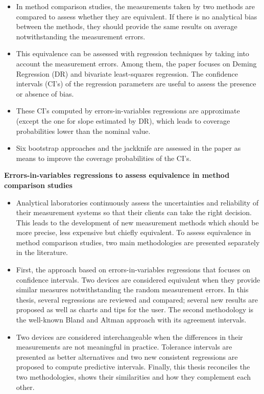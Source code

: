 \begin{itemize}
	\item In method comparison studies, the measurements taken by two methods are compared to assess whether they are equivalent. If there is no analytical bias between the methods, they should provide the same results on average notwithstanding the measurement errors.
	\item This equivalence can be assessed with regression techniques by taking into account the measurement errors. Among them, the paper focuses on Deming Regression (DR) and bivariate least-squares regression. The confidence intervals (CI's) of the regression parameters are useful to assess the presence or absence of bias. 
	\item These CI's computed by errors-in-variables regressions are approximate (except the one for slope estimated by DR), which leads to coverage probabilities lower than the nominal value. 
	\item Six bootstrap approaches and the jackknife are assessed in the paper as means to improve the coverage probabilities of the CI's.
\end{itemize}


\newpage
\textbf{Errors-in-variables regressions to assess equivalence in method comparison studies}
\begin{itemize}
\item Analytical laboratories continuously assess the uncertainties and reliability of their measurement systems so that their clients can take the right decision. This leads to the development of new measurement methods which should be more precise, less expensive but chiefly equivalent. To assess equivalence in method comparison studies, two main methodologies are presented separately in the literature. 
\item First, the approach based on errors-in-variables regressions that focuses on confidence intervals. Two devices are considered equivalent when they provide similar measures notwithstanding the random measurement errors. In this thesis, several regressions are reviewed and compared; several new results are proposed as well as charts and tips for the user. The second methodology is the well-known Bland and Altman approach with its agreement intervals. 
\item Two devices are considered interchangeable when the differences in their measurements are not meaningful in practice. Tolerance intervals are presented as better alternatives and two new consistent regressions are proposed to compute predictive intervals. Finally, this thesis reconciles the two methodologies, shows their similarities and how they complement each other.
\end{itemize}
